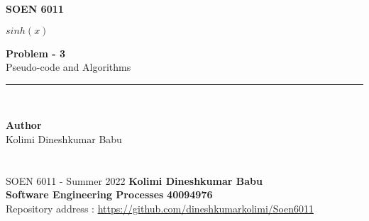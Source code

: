 \documentclass[letterpaper, 11pt]{report}
\begin{document}
\begin{titlepage}
\vspace*{0.7in}
\begin{center}
\begin{figure}[htb]
\begin{center}

\end{center}
\end{figure}
\vspace*{0.3in}
\begin{Large}
\textbf{SOEN 6011} \\
\end{Large}
\vspace*{0.1in}
\begin{Large}

\end{Large}
\vspace*{0.9in}
\begin{Large}
\textbf{$sinh(x)$} \\
\end{Large}
\vspace*{0.9in}


\begin{Large} 
\textbf{Problem - 3} \\
Pseudo-code and Algorithms\\
\end{Large}
\vspace*{0.625in}
\rule{80mm}{0.1mm}\\
\vspace*{0.1in}
\begin{large}
\textbf{Author} \\
\vspace*{0.1in}
Kolimi Dineshkumar Babu
\vspace*{0.3in}
\date{\normalsize\today} 
\end{large}
\end{center}
\end{titlepage}

\newpage
\section*{}
\normalsize {SOEN 6011 - Summer 2022} \hfill \textbf{Kolimi Dineshkumar Babu} \\
\textbf{ Software Engineering Processes}  \hfill \textbf{40094976} \\
\hfill Repository address : \url{https://github.com/dineshkumarkolimi/Soen6011}
\\\\
\end{document}
